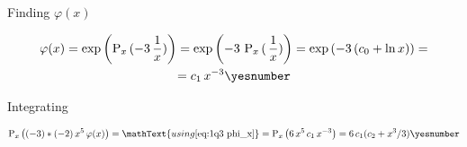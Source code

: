 \documentclass["AM3C-tests_resolutions.tex"]{subfiles}
\begin{document}
\begin{questionBox}
  Finding \(\varphi(x)\)
  \begin{tcolorbox}
    \begin{gather*}
      \varphi(x)
      = \exp{\left(
        \prim_x{(
          -3
          \,\frac{1}{x}
        )}
      \right)}
      = \exp{\left(
        -3\,\prim_x{(
          \,\frac{1}{x}
        )}
      \right)}
      = \exp{\left(
          -3\,(c_0+\ln{x})
      \right)}
      = \\
      = 
      c_1\,x^{-3}
      \yesnumber\label{eq:1q3 phi_x}
    \end{gather*}
  \end{tcolorbox}

  Integrating
  \begin{tcolorbox}
    \begin{gather*}
      \prim_x{\left(
          (-3)*(-2)\,x^5
        \,\varphi(x)
      \right)}
      = \mathText{using \eqref{eq:1q3 phi_x}}
      = \prim_x{\left(
        6\,x^5\,c_1\,x^{-3}
      \right)}
      = 
      6\,c_1( c_2 + x^3/3)
      \yesnumber\label{eq:1q3 prim}
    \end{gather*}
  \end{tcolorbox}
\end{questionBox}
\end{document}
